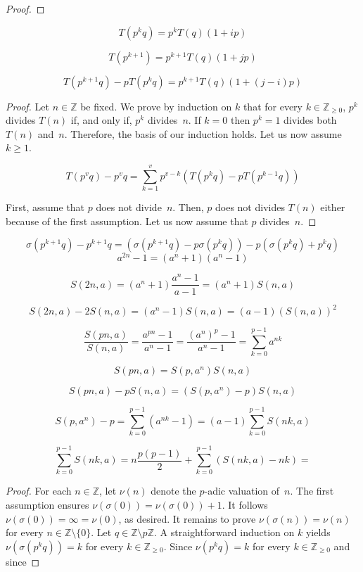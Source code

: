 \documentclass[12pt]{article}
\newcommand{\bZ}{\mathbb{Z}}
\newcommand{\bN}{\bZ_{\ge 0}}%
\theoremstyle{definition}
\begin{document}
\begin{proof}
 \end{proof} 
$$
T(p^k q) = p^k T(q)(1 + i p)
$$

$$
T(p^{k + 1}) = p^{k + 1} T(q)(1 + j p)
$$

$$
T(p^{k + 1} q) - p T(p^k q) = p^{k + 1}T(q)(1 + (j - i) p)
$$

\begin{proof}
  Let $n \in \bZ$ be fixed.
  We prove by induction on $k$ that for every $k \in \bN$,
  $p^k$ divides $T(n)$ if, and only if, $p^k$ divides~$n$.
  If $k = 0$ then $p^k = 1$ divides both $T(n)$ and~$n$.
  Therefore, the basis of our induction holds.
  Let us now assume $k \ge 1$.

  $$
  T(p^v q) - p^v q =
  \sum_{k = 1}^v p^{v - k} \left(  T(p^k q) - p T(p^{k - 1} q)  \right) 
  $$

  
  First, assume that $p$ does not divide~$n$.
  Then, $p$ does not divides $T(n)$ either because of the first assumption.
  Let us now assume that $p$ divides~$n$.
  
  
\end{proof}

$$
\sigma(p^{k + 1} q) - p^{k + 1}q = (\sigma(p^{k + 1} q) - p \sigma(p^k q)) - p (\sigma(p^k q) + p^k q) 
$$
$$
a^{2n} - 1 = (a^n + 1)(a^n - 1)
$$

$$
S(2 n, a) = (a^n + 1) \frac{a^n - 1}{a - 1} = (a^n + 1) S(n, a) 
$$

$$
S(2 n, a) - 2 S(n, a) = (a^n - 1) S(n, a) = (a - 1) \left( S(n, a) \right)^2
$$

 $$
 \frac{S(pn, a)}{S(n, a)}
 = \frac{a^{pn} - 1}{a^n - 1}
 = \frac{\left( a^n \right)^p - 1}{a^n - 1}
 = \sum_{k = 0}^{p - 1} a^{nk}
 $$

$$
S(pn, a) = S(p, a^n) S(n, a) 
$$

$$
S(pn, a) - p S(n, a) = (S(p, a^n) - p) S(n, a)  
$$



$$
S(p, a^n) - p 
= \sum_{k = 0}^{p - 1} (a^{n k} - 1)
= (a - 1) \sum_{k = 0}^{p - 1} S(n k, a)  
$$

$$
\sum_{k = 0}^{p - 1} S(n k, a) = n \frac{p(p - 1)}{2} + \sum_{k = 0}^{p - 1} \left( S(n k, a) - n k \right) =  
$$
\begin{proof}
 
  For each $n \in \bZ$, let $\nu(n)$ denote the $p$-adic valuation of~$n$.
  The first assumption ensures $\nu(\sigma(0)) = \nu(\sigma(0)) + 1$.
  It follows $\nu(\sigma(0)) = \infty = \nu(0)$, as desired.
  It remains to prove $\nu(\sigma(n)) = \nu(n)$ for every $n \in \bZ \setminus \{ 0 \}$.
  Let $q \in \bZ \setminus p \bZ$.
  A straightforward induction on $k$ yields $\nu(\sigma(p^k q)) = k$ for every $k \in \bN$.
  Since $\nu(p^k q) = k$ for every $k \in \bN$ and since 
\end{proof}
\end{document}
